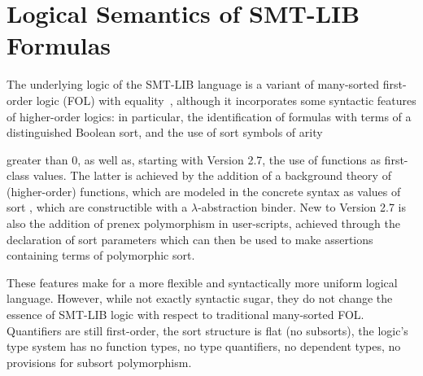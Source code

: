 



\chapter{Logical Semantics of SMT-LIB Formulas} \label{chap:logical-semantics}
\thispagestyle{empty}

The underlying logic of the SMT-LIB language is a variant of many-sorted 
first-order logic (FOL) with equality~\cite{Man-MSL-93,Gal-86,Hen-01},
although it incorporates some syntactic  features 
of higher-order logics:
in particular, the identification of formulas with terms 
of a distinguished Boolean sort, and the use of sort symbols of arity 
\begin{newver}
greater than 0,
as well as, starting with Version 2.7, the use of functions as first-class values.
The latter is achieved by the addition of a background theory 
of (higher-order) functions,
which are modeled in the concrete syntax 
as values of sort ,
which are constructible with a $\lambda$-abstraction binder.
New to Version 2.7 is also the addition of prenex polymorphism in user-scripts,
achieved through the declaration of sort parameters which can then 
be used to make assertions containing terms of polymorphic sort.
\end{newver}

These features make for a more flexible and syntactically more uniform 
logical language.
However, while not exactly syntactic sugar, they do not change the essence 
of SMT-LIB logic with respect to traditional many-sorted FOL.
Quantifiers are still first-order, the sort structure is flat (no subsorts),
the logic's type system has no function types, 
no type quantifiers, no dependent types,
no provisions for subsort polymorphism.

